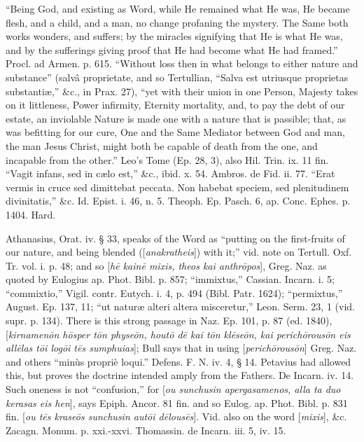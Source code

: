 ``Being
God, and existing as Word, while He remained what He was, He became
flesh, and a child, and a man, no change profaning the mystery. The
Same both works wonders, and suffers; by the miracles signifying that
He is what He was, and by the sufferings giving proof that He had
become what He had framed.'' Procl. ad Armen. p. 615. ``Without loss
then in what belongs to either nature and substance'' (salvâ
proprietate, and so Tertullian, ``Salva est utriusque proprietas
substantiæ,'' \&c., in Prax. 27), ``yet with their union in one
Person, Majesty takes on it littleness, Power infirmity, Eternity
mortality, and, to pay the debt of our estate, an inviolable Nature is
made one with a nature that is passible; that, as was befitting for
our cure, One and the Same Mediator between God and man, the man
Jesus Christ, might both be capable of death from the one, and
incapable from the other.'' Leo's Tome (Ep. 28, 3), also Hil. Trin. ix.
11 fin. ``Vagit infans, sed in cælo est,'' \&c., ibid. x. 54. Ambros.
de Fid. ii. 77. ``Erat vermis in cruce sed dimittebat peccata. Non
habebat speciem, sed plenitudinem divinitatis,'' \&c. Id. Epist. i.
46, n. 5. Theoph. Ep. Pasch. 6, ap. Conc. Ephes. p. 1404. Hard.

Athanasius,
Orat. iv. § 33, speaks of the Word as ``putting on the first-fruits of
our nature, and being blended ([\emph{anakratheis}]) with it;'' vid.
note on Tertull. Oxf. Tr. vol. i. p. 48; and so [\emph{h\={e} kain\={e}
mixis, theos kai anthr\={o}pos}], Greg. Naz. as quoted by
Eulogius ap. Phot. Bibl. p. 857; ``immixtus,'' Cassian. Incarn. i. 5; ``commixtio,''
Vigil. contr. Eutych. i. 4, p. 494 (Bibl. Patr. 1624); ``permixtus,''
August. Ep. 137, 11; ``ut naturæ alteri altera misceretur,'' Leon. Serm.
23, 1 (vid. supr. p. 134). There is this strong passage in Naz. Ep.
101, p. 87 (ed. 1840), [\emph{kirnamen\={o}n h\={o}sper t\={o}n
physe\={o}n, hout\={o} d\={e} kai t\={o}n kl\={e}se\={o}n,
kai perich\={o}rous\={o}n eis all\={e}las t\={o}i log\={o}i
t\={e}s sumphuias}]; Bull says that in using [\emph{perich\={o}rous\={o}n}]
Greg. Naz. and others ``minùs propriè loqui.'' Defens. F. N. iv. 4, §
14. Petavius had allowed this, but proves the doctrine intended amply
from the Fathers. De Incarn. iv. 14. Such oneness is not ``confusion,''
for [\emph{ou sunchusin apergasamenos, alla ta duo kerasas eis hen}],
says Epiph. Ancor. 81 fin. and so Eulog. ap. Phot. Bibl. p. 831 fin. [\emph{ou
t\={e}s krase\={o}s sunchusin aut\={o}i d\={e}lous\={e}s}].
Vid. also on the word [\emph{mixis}], \&c. Zacagn. Monum. p.
xxi.-xxvi. Thomassin. de Incarn. iii. 5, iv. 15.

